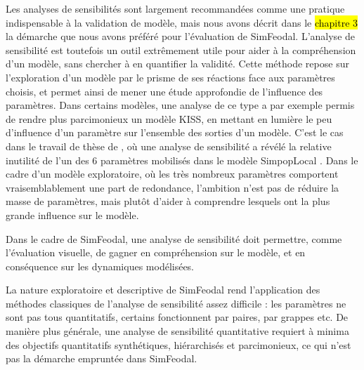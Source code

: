 Les analyses de sensibilités sont largement recommandées comme une pratique indispensable à la validation de modèle, mais nous avons décrit dans le \hl{chapitre 3} la démarche que nous avons préféré pour l'évaluation de SimFeodal.
L'analyse de sensibilité est toutefois un outil extrêmement utile pour aider à la compréhension d'un modèle, sans chercher à en quantifier la validité.
Cette méthode repose sur l'exploration d'un modèle par le prisme de ses réactions face aux paramètres choisis, et permet ainsi de mener une étude approfondie de l'influence des paramètres.
Dans certains modèles, une analyse de ce type a par exemple permis de rendre plus parcimonieux un modèle KISS, en mettant en lumière le peu d'influence d'un paramètre sur l'ensemble des sorties d'un modèle.
C'est le cas dans le travail de thèse de , où une analyse de sensibilité a révélé la relative inutilité de l'un des 6 paramètres mobilisés dans le modèle SimpopLocal \autocite[224-225]{schmitt_modelisation_2014}.
Dans le cadre d'un modèle exploratoire, où les très nombreux paramètres comportent vraisemblablement une part de redondance, l'ambition n'est pas de réduire la masse de paramètres, mais plutôt d'aider à comprendre lesquels ont la plus grande influence sur le modèle.

Dans le cadre de SimFeodal, une analyse de sensibilité doit permettre, comme l'évaluation visuelle, de gagner en compréhension sur le modèle, et en conséquence sur les dynamiques modélisées.

La nature exploratoire et descriptive de SimFeodal rend l'application des méthodes classiques de l'analyse de sensibilité assez difficile : les paramètres ne sont pas tous quantitatifs, certains fonctionnent par paires, par grappes etc.
De manière plus générale, une analyse de sensibilité quantitative requiert à minima des objectifs quantitatifs synthétiques, hiérarchisés et parcimonieux, ce qui n'est pas la démarche empruntée dans SimFeodal.

